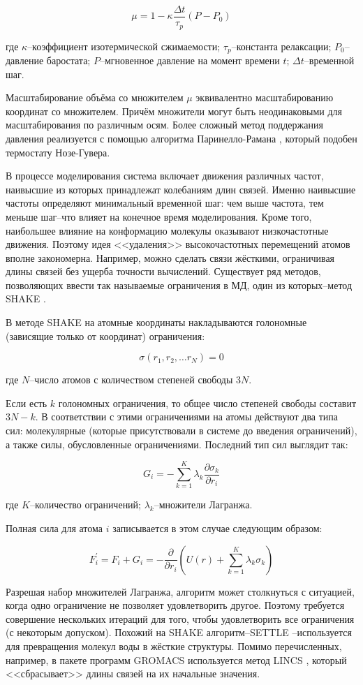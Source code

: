 \[
\mu = 1 - \kappa {\frac{\Delta t}{\tau_p}} (P - P_0)
\]

где $\kappa$--коэффициент изотермической сжимаемости; $\tau_p$--константа релаксации; $P_0$--давление баростата; $P$--мгновенное давление на момент времени $t$; $\Delta t$--временной шаг.

Масштабирование объёма со множителем $\mu$ эквивалентно масштабированию координат со множителем. Причём множители могут быть неодинаковыми для масштабирования по различным осям. Более сложный метод поддержания давления реализуется с помощью алгоритма Паринелло-Рамана \cite{Parrinello1981}, который подобен термостату Нозе-Гувера.

В процессе моделирования система включает движения различных частот, наивысшие из которых принадлежат колебаниям длин связей. Именно наивысшие частоты определяют минимальный временной шаг: чем выше частота, тем меньше шаг--что влияет на конечное время моделирования. Кроме того, наибольшее влияние на конформацию молекулы оказывают низкочастотные движения. Поэтому идея <<удаления>> высокочастотных перемещений атомов вполне закономерна. Например, можно сделать связи жёсткими, ограничивая длины связей без ущерба точности вычислений. Существует ряд методов, позволяющих ввести так называемые ограничения в МД, один из которых--метод SHAKE \cite{Ryckaert1977}.

В методе SHAKE на атомные координаты накладываются голономные (зависящие только от координат) ограничения:

\[
\sigma(r_1, r_2, \ldots r_N) = 0
\]

где $N$--число атомов с количеством степеней свободы $3N$.

Если есть $k$ голономных ограничения, то общее число степеней свободы составит $3N-k$. В соответствии с этими ограничениями на атомы действуют два типа сил: молекулярные (которые присутствовали в системе до введения ограничений), а также силы, обусловленные ограничениями. Последний тип сил выглядит так:

\[
G_i = - \sum_{k=1}^K {\lambda_k \frac{\partial \sigma_k}{\partial r_i}}
\]

где $K$--количество ограничений; $\lambda_k$--множители Лагранжа.

Полная сила для атома $i$ записывается в этом случае следующим образом:

\[
F_i^{'} = F_i + G_i = - {\frac{\partial}{\partial r_i}} \left ( U(r) + \sum_{k=1}^K {\lambda_k \sigma_k} \right )
\]

Разрешая набор множителей Лагранжа, алгоритм может столкнуться с ситуацией, когда одно ограничение не позволяет удовлетворить другое. Поэтому требуется совершение нескольких итераций для того, чтобы удовлетворить все ограничения (с некоторым допуском). Похожий на SHAKE алгоритм--SETTLE \cite{Miyamoto1992}--используется для превращения молекул воды в жёсткие структуры. Помимо перечисленных, например, в пакете программ GROMACS используется метод LINCS \cite{Hess1997}, который <<сбрасывает>> длины связей на их начальные значения.
